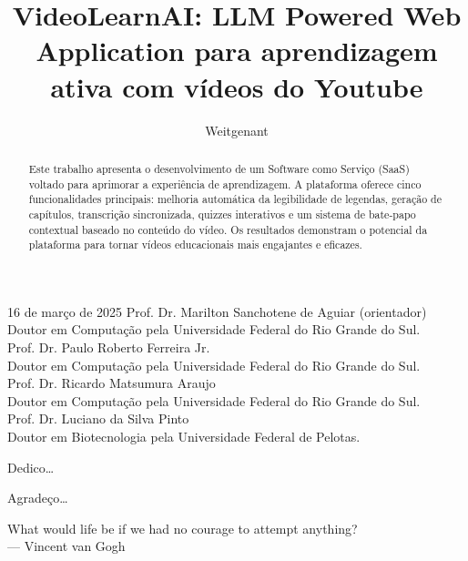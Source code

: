 \documentclass[tcc,capa]{texufpel}
\title{VideoLearnAI: LLM Powered Web Application para aprendizagem ativa com vídeos do Youtube}
\author{Weitgenant}{Kevin Castro}
\begin{document}

\maketitle 

\sloppy

\fichacatalografica


\begin{aprovacao}{16 de março de 2025} %
\noindent Prof. Dr. Marilton Sanchotene de Aguiar (orientador)\\
Doutor em Computação pela Universidade Federal do Rio Grande do Sul.\\[1cm]

\noindent Prof. Dr. Paulo Roberto Ferreira Jr.\\
Doutor em Computação pela Universidade Federal do Rio Grande do Sul.\\[1cm]

\noindent Prof. Dr. Ricardo Matsumura Araujo\\
Doutor em Computação pela Universidade Federal do Rio Grande do Sul.\\[1cm]

\noindent Prof. Dr. Luciano da Silva Pinto\\
Doutor em Biotecnologia pela Universidade Federal de Pelotas.
\end{aprovacao}

\begin{dedicatoria}
  Dedico\ldots 
\end{dedicatoria}

\begin{agradecimentos}
  Agradeço\ldots 
\end{agradecimentos}

\begin{epigrafe}
  What would life be if we had no courage to attempt anything?\\
  {\sc --- Vincent van Gogh}
\end{epigrafe}


\begin{abstract}
  Este trabalho apresenta o desenvolvimento de um Software como Serviço (SaaS) voltado para aprimorar a experiência de aprendizagem. A plataforma oferece cinco funcionalidades principais: melhoria automática da legibilidade de legendas, geração de capítulos, transcrição sincronizada, quizzes interativos e um sistema de bate-papo contextual baseado no conteúdo do vídeo. Os resultados demonstram o potencial da plataforma para tornar vídeos educacionais mais engajantes e eficazes.
  
  \end{abstract}
  
\end{document}
